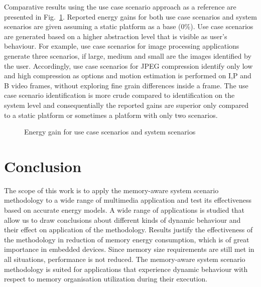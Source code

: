 \documentclass{acm_proc_article-sp}
\begin{document}
Comparative results using the use case scenario approach as a reference are presented in Fig.~\ref{fig:usecase}. Reported energy gains for both use case scenarios and system scenarios are given assuming a static platform as a base (0\%). Use case scenarios are generated based on a higher abstraction level that is visible as user's behaviour. For example, use case scenarios for image processing applications generate three scenarios, if large, medium and small are the images identified by the user. Accordingly, use case scenarios for JPEG compression identify only low and high compression as options and motion estimation is performed on I,P and B video frames, without exploring fine grain differences inside a frame. The use case scenario identification is more crude compared to identification on the system level and consequentially the reported gains are superior only compared to a static platform or sometimes a platform with only two scenarios.  

\begin{figure}[!t]
\centering
\caption{Energy gain for use case scenarios and system scenarios}
\label{fig:usecase}
\end{figure}

\section{Conclusion}
\label{sec:conclusion}

The scope of this work is to apply the memory-aware system scenario methodology to a wide range of multimedia application and test its effectiveness based on accurate energy models. A wide range of applications is studied that allow us to draw conclusions about different kinds of dynamic behaviour and their effect on application of the methodology. Results justify the effectiveness of the methodology in reduction of memory energy consumption, which is of great importance in embedded devices. Since memory size requirements are still met in all situations, performance is not reduced. The memory-aware system scenario methodology is suited for applications that experience dynamic behaviour with respect to memory organisation utilization during their execution.


%


\balancecolumns
\end{document}
